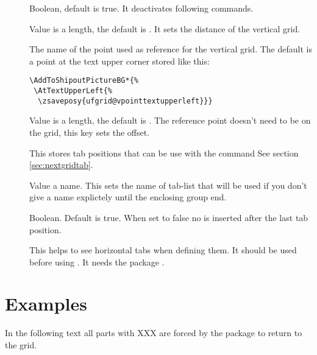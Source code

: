 \documentclass[twoside,parskip=half-,fontsize=12pt,egregdoesnotlikesansseriftitles,headings=normal]{scrartcl}
\begin{document}
\begin{description}
\item[] Boolean, default is true. It deactivates following  commands.

\item[] Value is a length, the default is . It sets the distance of the vertical grid.

\item[] The name of the point used as reference for the vertical grid. The default is a point at the text upper corner stored like this:

\begin{lstlisting}
\AddToShipoutPictureBG*{%
 \AtTextUpperLeft{%
  \zsaveposy{ufgrid@vpointtextupperleft}}}
\end{lstlisting}

\item[] Value is a length, the default is . The reference point doesn't need to be on the grid, this key sets the offset.

\item[] This stores tab positions that can be use with the  command See section \ref{sec:nextgridtab}.

\item[] Value a name. This sets the name of tab-list that will be used if you don't give a name explictely until the enclosing group end.

\item[] Boolean. Default is true. When set to false no \cs{\hfill} is inserted after the last tab position.

 \item[] This helps to see horizontal tabs when defining them. It should be used before using   . It needs the package .
\end{description}






\newpage
\section{Examples}

\returntogrid In the following text all parts with XXX are forced by the package to return to the grid.
\end{document}
